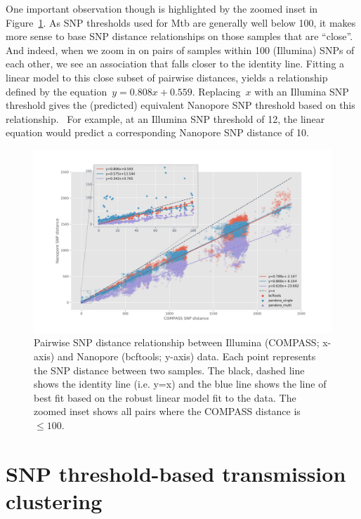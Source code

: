 One important observation though is highlighted by the zoomed inset in
Figure~{\ref{638875}}. As SNP thresholds used for Mtb
are generally well below 100, it makes more sense to base SNP distance
relationships on those samples that are ``close''. And indeed, when we
zoom in on pairs of samples within 100 (Illumina) SNPs of each other, we
see an association that falls closer to the identity line. Fitting a
linear model to this close subset of pairwise distances, yields a
relationship defined by the equation~\(y=0.808x+0.559\).
Replacing~\(x\) with an Illumina SNP threshold gives the
(predicted) equivalent Nanopore SNP threshold based on this
relationship.~ For example, at an Illumina SNP threshold of 12, the
linear equation would predict a corresponding Nanopore SNP distance of
10.~



\begin{figure}
\begin{center}
\includegraphics[width=0.90\columnwidth]{Chapter2/Figs/combined-dotplots.png}
\caption{{Pairwise SNP distance relationship between Illumina (COMPASS; x-axis)
and Nanopore (bcftools; y-axis) data. Each point represents the SNP
distance between two samples. The black, dashed line shows the identity
line (i.e. y=x) and the blue line shows the line of best fit based on
the robust linear model fit to the data. The zoomed inset shows all
pairs where the COMPASS distance is~\(\le100\).
{\label{638875}}%
}}
\end{center}
\end{figure}




\section{SNP threshold-based \ont{} transmission clustering}

